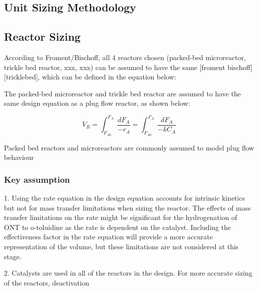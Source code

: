 \begin{landscape}
\section{Unit Sizing Methodology}
\label{app:sizing}
\subsection{Reactor Sizing}
According to Froment/Bischoff, all 4 reactors chosen (packed-bed microreactor, trickle bed reactor, xxx, xxx) can be assumed to have the same [froment bischoff][tricklebed], which can be defined in the equation below:

The packed-bed microreactor and trickle bed reactor are assumed to have the same design equation as a plug flow reactor, as shown below:

\begin{equation}
    V_R = \int_{F_{A0}}^{F_{A}} \frac{dF_A}{-r_A} = \int_{F_{A0}}^{F_{A}} \frac{dF_A}{-kC_A}
    \label{reactor_sizing}
\end{equation}

Packed bed reactors and microreactors are commonly assumed to model plug flow behaviour 

\subsubsection{Key assumption}
 
1. Using the rate equation in the design equation accounts for intrinsic kinetics but not for mass transfer limitations when sizing the reactor. The effects of mass transfer limitations on the rate might be significant for the hydrogenation of ONT to o-toluidine as the rate is dependent on the catalyst. Including the effectiveness factor in the rate equation will provide a more accurate representation of the volume, but these limitations are not considered at this stage.

2. Catalysts are used in all of the reactors in the design. For more accurate sizing of the reactors, deactivation 

\end{landscape}
